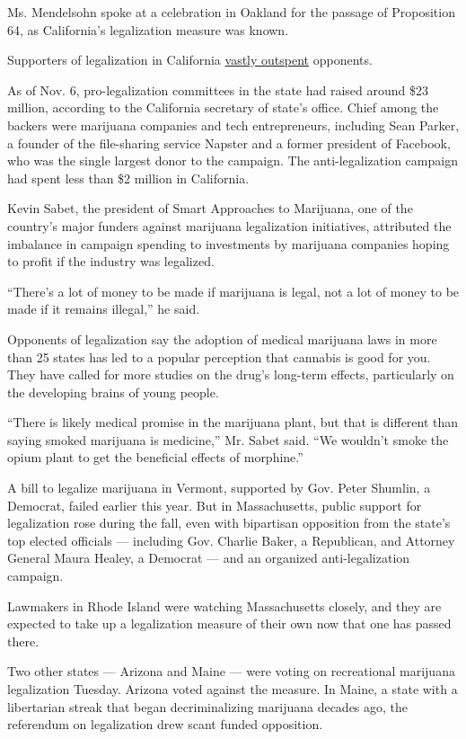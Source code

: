 Ms. Mendelsohn spoke at a celebration in Oakland for the passage of
Proposition 64, as California's legalization measure was known.

Supporters of legalization in California
\href{http://www.nytimes3xbfgragh.onion/2016/10/25/us/marijuana-legalization-ballot-measures.html}{vastly
outspent} opponents.

As of Nov. 6, pro-legalization committees in the state had raised around
\$23 million, according to the California secretary of state's office.
Chief among the backers were marijuana companies and tech entrepreneurs,
including Sean Parker, a founder of the file-sharing service Napster and
a former president of Facebook, who was the single largest donor to the
campaign. The anti-legalization campaign had spent less than \$2 million
in California.

Kevin Sabet, the president of Smart Approaches to Marijuana, one of the
country's major funders against marijuana legalization initiatives,
attributed the imbalance in campaign spending to investments by
marijuana companies hoping to profit if the industry was legalized.

``There's a lot of money to be made if marijuana is legal, not a lot of
money to be made if it remains illegal,'' he said.

Opponents of legalization say the adoption of medical marijuana laws in
more than 25 states has led to a popular perception that cannabis is
good for you. They have called for more studies on the drug's long-term
effects, particularly on the developing brains of young people.

``There is likely medical promise in the marijuana plant, but that is
different than saying smoked marijuana is medicine,'' Mr. Sabet said.
``We wouldn't smoke the opium plant to get the beneficial effects of
morphine.''

A bill to legalize marijuana in Vermont, supported by Gov. Peter
Shumlin, a Democrat, failed earlier this year. But in Massachusetts,
public support for legalization rose during the fall, even with
bipartisan opposition from the state's top elected officials ---
including Gov. Charlie Baker, a Republican, and Attorney General Maura
Healey, a Democrat --- and an organized anti-legalization campaign.

Lawmakers in Rhode Island were watching Massachusetts closely, and they
are expected to take up a legalization measure of their own now that one
has passed there.

Two other states --- Arizona and Maine --- were voting on recreational
marijuana legalization Tuesday. Arizona voted against the measure. In
Maine, a state with a libertarian streak that began decriminalizing
marijuana decades ago, the referendum on legalization drew scant funded
opposition.

